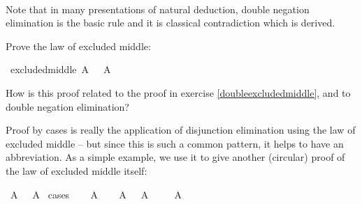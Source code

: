 \begin{isabellebody}
\isanewline
\ \ \isamarkupfalse%
\isanewline
{}\isamarkupfalse%
%
\endisatagproof
{\isafoldproof}%
%
\isadelimproof
%
\endisadelimproof
%
\begin{isamarkuptext}%
Note that in many presentations of natural deduction, double negation elimination is the basic
rule and it is classical contradiction which is derived.%
\end{isamarkuptext}\isamarkuptrue%
%
\begin{isamarkuptext}%
\begin{Exercise}[title = The Law of Excluded Middle]\label{excludedmiddle} 
Prove the law of excluded middle: \end{Exercise}%
\end{isamarkuptext}\isamarkuptrue%
\isamarkupfalse%
\ excluded{\isacharunderscore}middle{\isacharcolon}\ {\isachardoublequoteopen}A\ {\isasymor}\ {\isasymnot}\ A{\isachardoublequoteclose}%
\isadelimproof
\ %
\endisadelimproof
%
\isatagproof
{}\isamarkupfalse%
%
\endisatagproof
{\isafoldproof}%
%
\isadelimproof
%
\endisadelimproof
%
\begin{isamarkuptext}%
How is this proof related to the proof in exercise \ref{doubleexcludedmiddle}, and to double negation elimination?%
\end{isamarkuptext}\isamarkuptrue%
%
\isamarkuptrue%
%
\begin{isamarkuptext}%
Proof by cases is really the application of disjunction elimination using the law of excluded
middle -- but since this is such a common pattern, it helps to have an abbreviation. As a simple example,
we use it to give another (circular) proof of the law of excluded middle itself:%
\end{isamarkuptext}\isamarkuptrue%
\isamarkupfalse%
\ {\isachardoublequoteopen}A\ {\isasymor}\ {\isasymnot}\ A{\isachardoublequoteclose}\isanewline
%
\isadelimproof
%
\endisadelimproof
%
\isatagproof
{}\isamarkupfalse%
\ cases\isanewline
\ \ \isamarkupfalse%
\ {\isachardoublequoteopen}A{\isachardoublequoteclose}\isanewline
\ \ \isamarkupfalse%
\ {\isachardoublequoteopen}A\ {\isasymor}\ {\isasymnot}\ A{\isachardoublequoteclose}\isacommand{{\isachardot}{\isachardot}}\isamarkupfalse%
\isanewline
{}\isamarkupfalse%
\isanewline
\ \ \isamarkupfalse%
\ {\isachardoublequoteopen}{\isasymnot}\ A{\isachardoublequoteclose}\isanewline
\ \ \isamarkupfalse%

\end{isabellebody}
